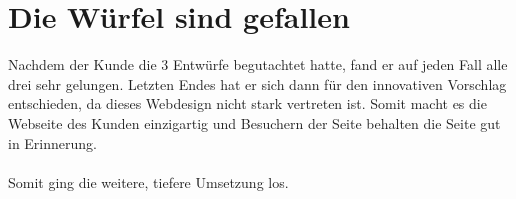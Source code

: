 \section{Die Würfel sind gefallen}
Nachdem der Kunde die 3 Entwürfe begutachtet hatte, fand er auf jeden Fall alle drei sehr gelungen. Letzten Endes hat er sich dann für den innovativen Vorschlag entschieden, da dieses Webdesign nicht stark vertreten ist. Somit macht es die Webseite des Kunden einzigartig und Besuchern der Seite behalten die Seite gut in Erinnerung. 
\\
\\
Somit ging die weitere, tiefere Umsetzung los.